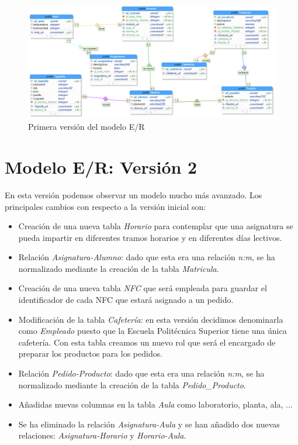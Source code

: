 \documentclass[12pt]{report}
\begin{document}
\begin{figure}[H]
    \centering
    \includegraphics[scale = 0.5]{imagenes//base_de_datos/ImagenBD.png}
    \caption{Primera versión del modelo E/R}
    \label{fig:Figura4}
\end{figure}
\newpage
\section{Modelo E/R: Versión 2}
En esta versión podemos observar un modelo mucho más avanzado. Los principales cambios con respecto a la versión inicial son:

\begin{itemize}
    \item Creación de una nueva tabla \textit{Horario} para contemplar que una asignatura se pueda impartir en diferentes tramos horarios y en diferentes días lectivos.
    \item Relación \textit{Asignatura-Alumno}: dado que esta era una relación \textit{n:m}, se ha normalizado mediante la creación de la tabla \textit{Matricula}.
    \item Creación de una nueva tabla \textit{NFC} que será empleada para guardar el identificador de cada NFC que estará asignado a un pedido.
    \item Modificación de la tabla \textit{Cafetería}: en esta versión decidimos denominarla como \textit{Empleado} puesto que la Escuela Politécnica Superior tiene una única cafetería. Con esta tabla creamos un nuevo rol que será el encargado de preparar los productos para los pedidos.
    \item Relación \textit{Pedido-Producto}: dado que esta era una relación \textit{n:m}, se ha normalizado mediante la creación de la tabla \textit{Pedido\_Producto}.
    \item Añadidas nuevas columnas en la tabla \textit{Aula} como laboratorio, planta, ala, ...
    \item Se ha eliminado la relación \textit{Asignatura-Aula} y se han añadido dos nuevas relaciones: \textit{Asignatura-Horario} y \textit{Horario-Aula}.
\end{itemize}  
\end{document}
